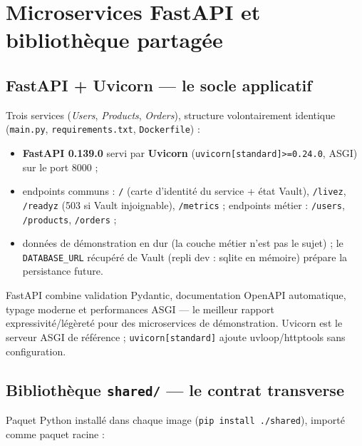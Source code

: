 \documentclass[11pt,a4paper]{article}
\begin{document}
\clearpage

\section{Microservices FastAPI et bibliothèque partagée}

\subsection{FastAPI + Uvicorn --- le socle applicatif}
Trois services (\emph{Users}, \emph{Products}, \emph{Orders}), structure volontairement identique (\texttt{main.py}, \texttt{requirements.txt}, \texttt{Dockerfile}) :
\begin{itemize}[itemsep=1pt]
  \item \textbf{FastAPI 0.139.0} servi par \textbf{Uvicorn} (\texttt{uvicorn[standard]>=0.24.0}, ASGI) sur le port 8000 ;
  \item endpoints communs : \texttt{/} (carte d'identité du service + état Vault), \texttt{/livez}, \texttt{/readyz} (503 si Vault injoignable), \texttt{/metrics} ; endpoints métier : \texttt{/users}, \texttt{/products}, \texttt{/orders} ;
  \item données de démonstration en dur (la couche métier n'est pas le sujet) ; le \texttt{DATABASE\_URL} récupéré de Vault (repli dev : sqlite en mémoire) prépare la persistance future.
\end{itemize}

\begin{whybox}
FastAPI combine validation Pydantic, documentation OpenAPI automatique, typage moderne et performances ASGI --- le meilleur rapport expressivité/légèreté pour des microservices de démonstration. Uvicorn est le serveur ASGI de référence ; \texttt{uvicorn[standard]} ajoute uvloop/httptools sans configuration.
\end{whybox}

\subsection{Bibliothèque \texttt{shared/} --- le contrat transverse}
Paquet Python installé dans chaque image (\texttt{pip install ./shared}), importé comme paquet racine :
\end{document}
